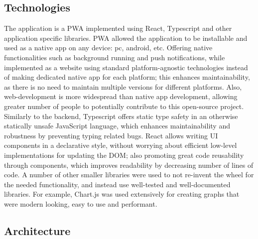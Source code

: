 \subsection{Technologies}
The application is a PWA implemented using React, Typescript and other application specific libraries. PWA allowed the application to be installable and used as a native app on any device: pc, android, etc. Offering native functionalities such as background running and push notifications, while implemented as a website using standard platform-agnostic technologies instead of making dedicated native app for each platform; this enhances maintainability, as there is no need to maintain multiple versions for different platforms. Also, web-development is more widespread than native app development, allowing greater number of people to potentially contribute to this open-source project. Similarly to the backend, Typescript offers static type safety in an otherwise statically unsafe JavaScript language, which enhances maintainability and robustness by preventing typing related bugs. React allows writing UI components in a declarative style, without worrying about efficient low-level implementations for updating the DOM; also promoting great code reusability through components, which improves readability by decreasing number of lines of code. A number of other smaller libraries were used to not re-invent the wheel for the needed functionality, and instead use well-tested and well-documented libraries. For example, Chart.js was used extensively for creating graphs that were modern looking, easy to use and performant. 
\subsection{Architecture}

